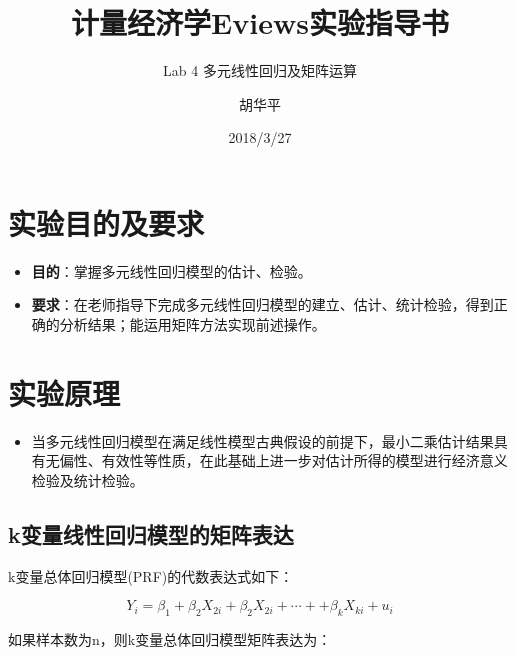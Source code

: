 \documentclass[12pt,(landscape,a4paper),(portrait,a4paper)]{article}
\title{计量经济学Eviews实验指导书}
\subtitle{Lab 4 多元线性回归及矩阵运算}
\author{胡华平}
\date{2018/3/27}
\makeatletter
\def\maxwidth{\ifdim\Gin@nat@width>\linewidth\linewidth\else\Gin@nat@width\fi}
\providecommand{\tightlist}{%
  \setlength{\itemsep}{0pt}\setlength{\parskip}{0pt}}
\let\stdsection\section
\renewcommand\section{\newpage\stdsection}
\makeatother
\begin{document}
\maketitle

\renewcommand{\figurename}{图}
\renewcommand{\contentsname}{目录}
\renewcommand{\tablename}{表}


\makeatletter
\def\maxwidth{ %
  \ifdim\Gin@nat@width>\linewidth
    \linewidth
  \else
    \Gin@nat@width
  \fi
}
\makeatother

{
\setcounter{tocdepth}{3}
\tableofcontents
}
\newpage

\section{实验目的及要求}

\begin{itemize}
\tightlist
\item
  \textbf{目的}：掌握多元线性回归模型的估计、检验。
\item
  \textbf{要求}：在老师指导下完成多元线性回归模型的建立、估计、统计检验，得到正确的分析结果；能运用矩阵方法实现前述操作。
\end{itemize}

\section{实验原理}

\begin{itemize}
\tightlist
\item
  当多元线性回归模型在满足线性模型古典假设的前提下，最小二乘估计结果具有无偏性、有效性等性质，在此基础上进一步对估计所得的模型进行经济意义检验及统计检验。
\end{itemize}

\hypertarget{k}{%
\subsection{k变量线性回归模型的矩阵表达}\label{k}}

k变量总体回归模型(PRF)的代数表达式如下：

\begin{equation}
Y_i=\beta_1+\beta_2X_{2i}+\beta_2X_{2i}+\cdots++\beta_kX_{ki}+u_i
\label{eq:PRM-algebra} 
\end{equation}

如果样本数为n，则k变量总体回归模型矩阵表达为：
\end{document}
